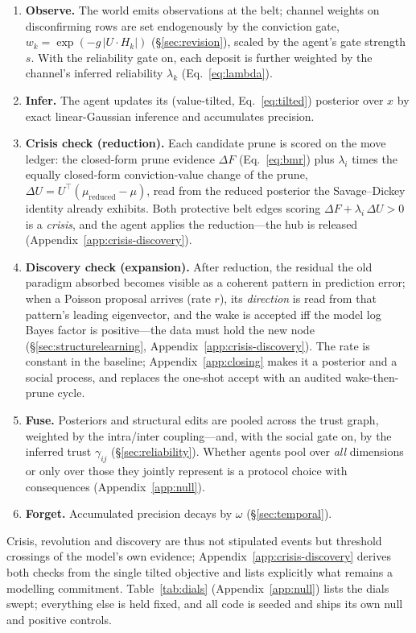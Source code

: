 \documentclass[runningheads]{llncs}
\begin{document}
\begin{enumerate}\itemsep1pt
\item \textbf{Observe.} The world emits observations at the belt; channel weights on disconfirming
rows are set endogenously by the conviction gate, $w_k=\exp(-g\,|U\!\cdot\!H_k|)$
(\S\ref{sec:revision}), scaled by the agent's gate strength $s$. With the reliability gate on,
each deposit is further weighted by the channel's inferred reliability $\lambda_k$
(Eq.~\ref{eq:lambda}).
\item \textbf{Infer.} The agent updates its (value-tilted, Eq.~\ref{eq:tilted}) posterior over $x$ by
exact linear-Gaussian inference and accumulates precision.
\item \textbf{Crisis check (reduction).} Each candidate prune is scored on the move ledger: the
closed-form prune evidence $\Delta F$ (Eq.~\ref{eq:bmr}) plus $\lambda_i$ times the equally
closed-form conviction-value change of the prune,
$\Delta U = U^{\!\top}\!(\mu_{\mathrm{reduced}}-\mu)$, read from the reduced posterior the
Savage--Dickey identity already exhibits. Both protective belt edges scoring
$\Delta F + \lambda_i\,\Delta U > 0$ is a \emph{crisis}, and the agent applies the reduction---the
hub is released (Appendix~\ref{app:crisis-discovery}).
\item \textbf{Discovery check (expansion).} After reduction, the residual the old paradigm absorbed
becomes visible as a coherent pattern in prediction error; when a Poisson proposal arrives (rate
$r$), its \emph{direction} is read from that pattern's leading eigenvector, and the wake is
accepted iff the model log Bayes factor is positive---the data must hold the new node
(\S\ref{sec:structurelearning}, Appendix~\ref{app:crisis-discovery}). The rate is constant in
the baseline; Appendix~\ref{app:closing} makes it a posterior and a social process, and replaces the
one-shot accept with an audited wake-then-prune cycle.
\item \textbf{Fuse.} Posteriors and structural edits are pooled across the trust graph, weighted by
the intra/inter coupling---and, with the social gate on, by the inferred trust $\gamma_{ij}$
(\S\ref{sec:reliability}). Whether agents pool over \emph{all} dimensions or only over those they
jointly represent is a protocol choice with consequences (Appendix~\ref{app:null}).
\item \textbf{Forget.} Accumulated precision decays by $\omega$ (\S\ref{sec:temporal}).
\end{enumerate}

Crisis, revolution and discovery are thus not stipulated events but threshold crossings of the
model's own evidence; Appendix~\ref{app:crisis-discovery} derives both checks from the single
tilted objective and lists explicitly what remains a modelling commitment.
Table~\ref{tab:dials} (Appendix~\ref{app:null}) lists the dials swept; everything else is held
fixed, and all code is seeded and ships its own null and positive controls.
\end{document}
